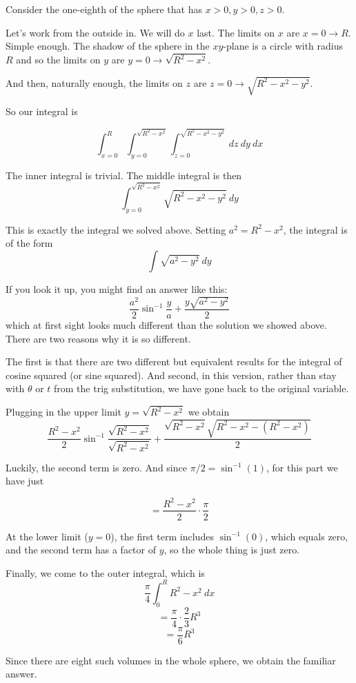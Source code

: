 \documentclass[11pt, oneside]{article}
\begin{document}
Consider the one-eighth of the sphere that has $x>0,y>0,z>0$.

Let's work from the outside in.  We will do $x$ last.  The limits on $x$ are $x=0 \rightarrow R$.  Simple enough.  The shadow of the sphere in the $xy$-plane is a circle with radius $R$ and so the limits on $y$ are $y=0 \rightarrow \sqrt{R^2-x^2}$.

And then, naturally enough, the limits on $z$ are $z=0 \rightarrow \sqrt{R^2 - x^2 - y^2}$.

So our integral is

\[ \int_{x=0}^{R} \int_{y=0}^{\sqrt{R^2-x^2}} \int_{z=0}^{\sqrt{R^2 - x^2 - y^2}} \ dz \ dy \ dx \]

The inner integral is trivial.  The middle integral is then
\[ \int_{y=0}^{\sqrt{R^2-x^2}} \sqrt{R^2 - x^2 - y^2} \ dy \]

This is exactly the integral we solved above.  Setting $a^2 = R^2 - x^2$, the integral is of the form
\[ \int \sqrt{a^2 - y^2} \ dy \]

If you look it up, you might find an answer like this:
\[ \frac{a^2}{2} \sin^{-1} \frac{y}{a} + \frac{y \sqrt{a^2-y^2}}{2} \]
which at first sight looks much different than the solution we showed above.  There are two reasons why it is so different.  

The first is that there are two different but equivalent results for the integral of cosine squared (or sine squared).  And second, in this version, rather than stay with $\theta$ or $t$ from the trig substitution, we have gone back to the original variable.

Plugging in the upper limit $y= \sqrt{R^2-x^2}$ we obtain
\[ \frac{R^2 - x^2}{2} \sin^{-1} \frac{\sqrt{R^2-x^2}}{\sqrt{R^2-x^2}} + \frac{\sqrt{R^2-x^2} \sqrt{R^2-x^2 - (R^2-x^2)}}{2} \]

Luckily, the second term is zero.  And since $\pi/2 =  \sin^{-1} (1)$, for this part we have just

\[ = \frac{R^2 - x^2}{2} \cdot \frac{\pi}{2} \]

At the lower limit ($y=0$), the first term includes $\sin^{-1} (0)$, which equals zero, and the second term has a factor of $y$, so the whole thing is just zero.

Finally, we come to the outer integral, which is
\[ \frac{\pi}{4} \int_0^R R^2 - x^2 \ dx \]
\[ = \frac{\pi}{4} \cdot \frac{2}{3} R^3 \]
\[ = \frac{\pi}{6} R^3 \]

Since there are eight such volumes in the whole sphere, we obtain the familiar answer.
\end{document}
